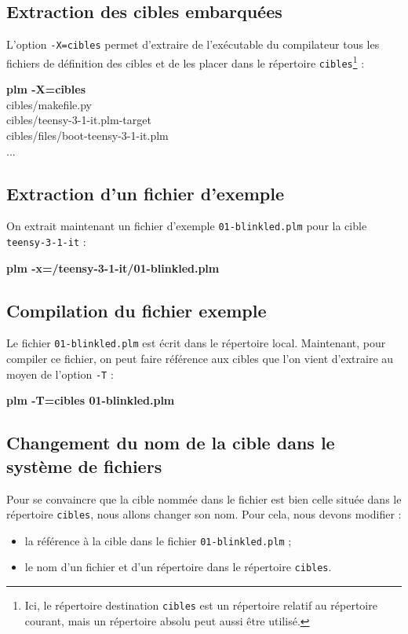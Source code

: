 \subsection{Extraction des cibles embarquées}
L'option \texttt{-X=cibles} permet d'extraire de l'exécutable du compilateur tous les fichiers de définition des cibles et de les placer dans le répertoire \texttt{cibles}\footnote{Ici, le répertoire destination \texttt{cibles} est un répertoire relatif au répertoire courant, mais un répertoire absolu peut aussi être utilisé.} :
\begin{SHELL}
{\bfseries plm -X=cibles}\\
\hspace*{1.2em}cibles/makef{}ile.py\\
\hspace*{1.2em}cibles/teensy-3-1-it.plm-target\\
\hspace*{1.2em}cibles/files/boot-teensy-3-1-it.plm\\
\hspace*{1.2em}...
\end{SHELL}

\subsection{Extraction d'un fichier d'exemple}
On extrait maintenant un fichier d'exemple \texttt{01-blinkled.plm} pour la cible \texttt{teensy-3-1-it} :
\begin{SHELL}
\bfseries plm -x=/teensy-3-1-it/01-blinkled.plm
\end{SHELL}

\subsection{Compilation du fichier exemple}
Le fichier \texttt{01-blinkled.plm} est écrit dans le répertoire local. Maintenant, pour compiler ce fichier, on peut faire référence aux cibles que l'on vient d'extraire au moyen de l'option \texttt{-T} :
\begin{SHELL}
\bfseries plm -T=cibles 01-blinkled.plm
\end{SHELL}


\subsection{Changement du nom de la cible dans le système de fichiers}

Pour se convaincre que la cible nommée dans le fichier est bien celle située dans le répertoire \texttt{cibles}, nous allons changer son nom. Pour cela, nous devons modifier :
\begin{itemize}
  \item la référence à la cible dans le fichier \texttt{01-blinkled.plm} ;
  \item le nom d'un fichier et d'un répertoire dans le répertoire \texttt{cibles}. 
\end{itemize}

